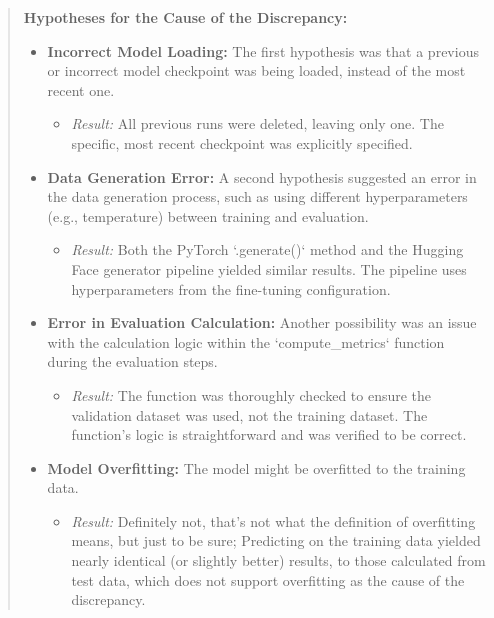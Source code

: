 \documentclass{article}
\begin{document}
\begin{quote}
\footnotesize{
\textbf{Hypotheses for the Cause of the Discrepancy:}
\begin{itemize}
    \item \textbf{Incorrect Model Loading:} The first hypothesis was that a previous or incorrect model checkpoint was being loaded, instead of the most recent one.
        \begin{itemize}
            \item \textit{Result:} All previous runs were deleted, leaving only one. The specific, most recent checkpoint was explicitly specified.
        \end{itemize}

    \item \textbf{Data Generation Error:} A second hypothesis suggested an error in the data generation process, such as using different hyperparameters (e.g., temperature) between training and evaluation.
        \begin{itemize}
            \item \textit{Result:} Both the PyTorch `.generate()` method and the Hugging Face generator pipeline yielded similar results. The pipeline uses hyperparameters from the fine-tuning configuration.
        \end{itemize}

    \item \textbf{Error in Evaluation Calculation:} Another possibility was an issue with the calculation logic within the `compute\_metrics` function during the evaluation steps.
        \begin{itemize}
            \item \textit{Result:} The function was thoroughly checked to ensure the validation dataset was used, not the training dataset. The function's logic is straightforward and was verified to be correct.
        \end{itemize}

    \item \textbf{Model Overfitting:} The model might be overfitted to the training data.
        \begin{itemize}
            \item \textit{Result:} Definitely not, that's not what the definition of overfitting means, but just to be sure; Predicting on the training data yielded nearly identical (or slightly better) results, to those calculated from test data, which does not support overfitting as the cause of the discrepancy.
        \end{itemize}
    

\end{itemize}}
\end{quote}
\end{document}
